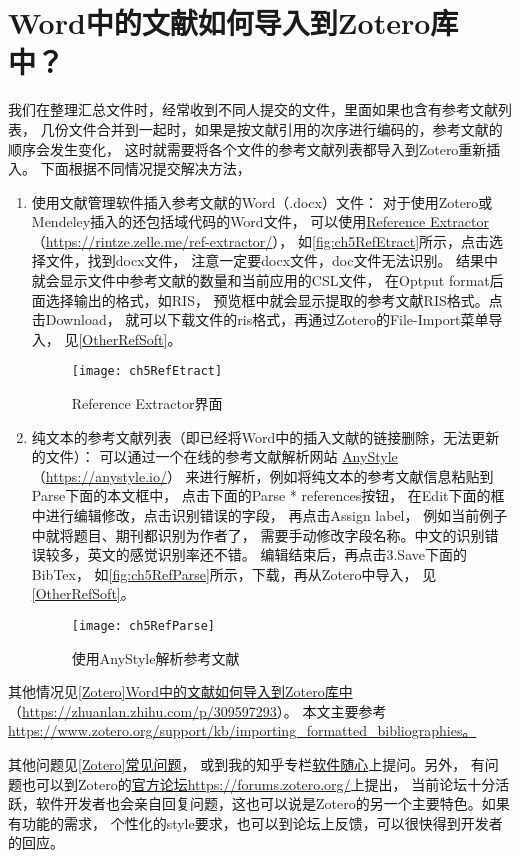 \documentclass[cn,11pt,chinese]{elegantbook}
\begin{document}
		\section{Word中的文献如何导入到Zotero库中？}\label{sec:RefExtract}	
			我们在整理汇总文件时，经常收到不同人提交的文件，里面如果也含有参考文献列表，
			几份文件合并到一起时，如果是按文献引用的次序进行编码的，参考文献的顺序会发生变化，
			这时就需要将各个文件的参考文献列表都导入到Zotero重新插入。
			下面根据不同情况提交解决方法，
			\begin{enumerate}
				\item 使用文献管理软件插入参考文献的Word（.docx）文件：				
				对于使用Zotero或Mendeley插入的还包括域代码的Word文件，
				可以使用\href{https://rintze.zelle.me/ref-extractor/}
				{Reference Extractor}（\url{https://rintze.zelle.me/ref-extractor/}），
				如\autoref{fig:ch5RefEtract}所示，点击选择文件，找到docx文件，
				注意一定要docx文件，doc文件无法识别。
				结果中就会显示文件中参考文献的数量和当前应用的CSL文件，
				在Optput format后面选择输出的格式，如RIS，
				预览框中就会显示提取的参考文献RIS格式。点击Download，
				就可以下载文件的ris格式，再通过Zotero的File-Import菜单导入，
				见\cref{OtherRefSoft}。
				\begin{figure}[htbp]
					\centering
					\texttt{[image: ch5RefEtract]}
					\caption{Reference Extractor界面}
					\label{fig:ch5RefEtract}
				\end{figure}
		\item 纯文本的参考文献列表（即已经将Word中的插入文献的链接删除，无法更新的文件）：		
			可以通过一个在线的参考文献解析网站
			\href{https://anystyle.io/}{AnyStyle}（\url{https://anystyle.io/}）
			来进行解析，例如将纯文本的参考文献信息粘贴到Parse下面的本文框中，
			点击下面的Parse * references按钮，
			在Edit下面的框中进行编辑修改，点击识别错误的字段，
			再点击Assign label，
			例如当前例子中就将题目、期刊都识别为作者了，
			需要手动修改字段名称。中文的识别错误较多，英文的感觉识别率还不错。
			编辑结束后，再点击3.Save下面的BibTex，
			如\autoref{fig:ch5RefParse}所示，下载，再从Zotero中导入，
			见\cref{OtherRefSoft}。
			\begin{figure}[t]
				\centering
				\texttt{[image: ch5RefParse]}
				\caption{使用AnyStyle解析参考文献}
				\label{fig:ch5RefParse}
			\end{figure}
			\end{enumerate}
			
			其他情况见\href{https://zhuanlan.zhihu.com/p/309597293}
			{[Zotero]Word中的文献如何导入到Zotero库中}
			（\url{https://zhuanlan.zhihu.com/p/309597293}）。			
			本文主要参考
			\url{https://www.zotero.org/support/kb/importing_formatted_bibliographies。}


		其他问题见\href{https://zhuanlan.zhihu.com/p/57379260}{[Zotero]常见问题}，
		或到我的知乎专栏\href{https://zhuanlan.zhihu.com/c_1071081428967743488}{软件随心}上提问。另外，
		有问题也可以到Zotero的\href{https://forums.zotero.org/}{官方论坛https://forums.zotero.org/}上提出，
		当前论坛十分活跃，软件开发者也会亲自回复问题，这也可以说是Zotero的另一个主要特色。如果有功能的需求，
		个性化的style要求，也可以到论坛上反馈，可以很快得到开发者的回应。
		
\end{document}
